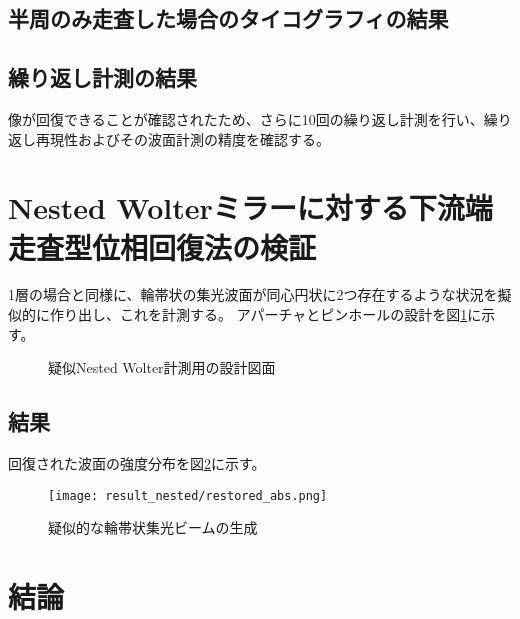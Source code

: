 \subsection{半周のみ走査した場合のタイコグラフィの結果}

\subsection{繰り返し計測の結果}

像が回復できることが確認されたため、さらに10回の繰り返し計測を行い、繰り返し再現性およびその波面計測の精度を確認する。


\clearpage
\newpage

\section{Nested Wolterミラーに対する下流端走査型位相回復法の検証}

1層の場合と同様に、輪帯状の集光波面が同心円状に2つ存在するような状況を擬似的に作り出し、これを計測する。
アパーチャとピンホールの設計を図\ref{fig:lens_nested_pinhole_ring_aperture}に示す。

\begin{figure}[!ht]
\centering

\caption[]{疑似Nested Wolter計測用の設計図面}
\label{fig:lens_nested_pinhole_ring_aperture}
\end{figure}

\subsection{結果}

回復された波面の強度分布を図\ref{fig:result_nested_restored_abs}に示す。

\begin{figure}[!ht]
\centering
\texttt{[image: result\_nested/restored\_abs.png]}
\caption{疑似的な輪帯状集光ビームの生成}
\label{fig:result_nested_restored_abs}
\end{figure}



\clearpage
\newpage


\section{結論}
\label{chap4_conclusion}


